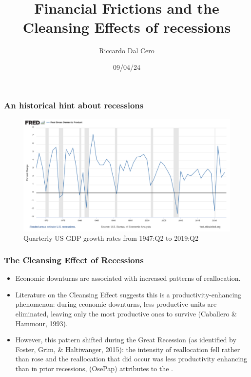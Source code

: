 \documentclass{beamer}
\title{Financial Frictions and the Cleansing Effects of recessions}
\author{Riccardo Dal Cero}
\date{09/04/24}
\begin{document}
\frame{\titlepage}
\begin{frame}
    \frametitle{An historical hint about recessions}
    \begin{figure}
    \centering
    \includegraphics[scale=0.27]{fredgraph.png}
    \caption{Quarterly US GDP growth rates from 1947:Q2 to 2019:Q2}
    \end{figure}
\end{frame}
\begin{frame}
    \frametitle{The Cleansing Effect of Recessions}
    \begin{itemize}
        \item Economic downturns are associated with increased patterns of reallocation.
        \item Literature on the Cleansing Effect suggests this is a productivity-enhancing phenomenon: during economic downturns, less productive units are eliminated, leaving only the most productive ones to survive (Caballero \& Hammour, 1993).
        \item However, this pattern shifted during the Great Recession (as identified by Foster, Grim, \& Haltiwanger, 2015): the intensity of reallocation
        fell rather than rose and the reallocation that did occur was less productivity enhancing than in prior
        recessions, (OsePap) attributes to the .
    \end{itemize}
\end{frame}
\end{document}
